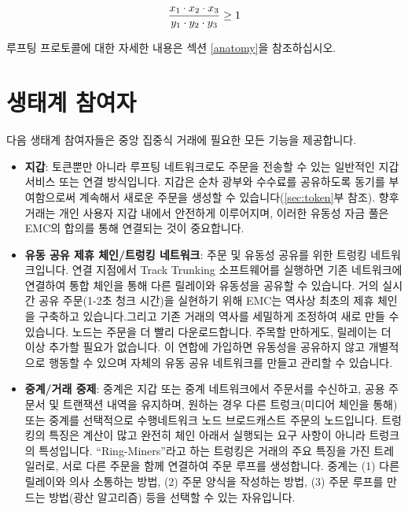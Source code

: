 \documentclass{article}
\begin{document}
\begin{multicols}{2}
\begin{equation}
	{{x_1 \cdot x_2 \cdot x_3 \over y_1 \cdot y_2 \cdot y_3}\geq 1}
\end{equation}

\indent 루프팅 프로토콜에 대한 자세한 내용은 섹션 \ref{anatomy}을 참조하십시오.  




\section{생태계 참여자\label{sec:ecosystem}}
\indent 다음 생태계 참여자들은 중앙 집중식 거래에 필요한 모든 기능을 제공합니다.

\begin{itemize}
	
	\item \textbf{지갑}: 토큰뿐만 아니라 루프팅 네트워크로도 주문을 전송할 수 있는 일반적인 지갑 서비스 또는 연결 방식입니다. 지갑은 순차 광부와 수수료를 공유하도록 동기를 부여함으로써 계속해서 새로운 주문을 생성할 수 있습니다(\ref{sec:token}부 참조). 향후 거래는 개인 사용자 지갑 내에서 안전하게 이루어지며, 이러한 유동성 자금 풀은 EMC의 합의를 통해 연결되는 것이 중요합니다.

	\item \textbf{유동 공유 제휴 체인/트렁킹 네트워크}: 주문 및 유동성 공유를 위한 트렁킹 네트워크입니다. 연결 지점에서 Track Trunking 소프트웨어를 실행하면 기존 네트워크에 연결하여 통합 체인을 통해 다른 릴레이와 유동성을 공유할 수 있습니다. 거의 실시간 공유 주문(1-2초 청크 시간)을 실현하기 위해 EMC는 역사상 최초의 제휴 체인을 구축하고 있습니다.그리고 기존 거래의 역사를 세밀하게 조정하여 새로 만들 수 있습니다. 노드는 주문을 더 빨리 다운로드합니다. 주목할 만하게도, 릴레이는 더 이상 추가할 필요가 없습니다. 이 연합에 가입하면 유동성을 공유하지 않고 개별적으로 행동할 수 있으며 자체의 유동 공유 네트워크를 만들고 관리할 수 있습니다.

	\item \textbf{중계/거래 중제}: 중계은 지갑 또는 중계 네트워크에서 주문서를 수신하고, 공용 주문서 및 트랜잭션 내역을 유지하며, 원하는 경우 다른 트렁크(미디어 체인을 통해) 또는 중계를 선택적으로 수행네트워크 노드 브로드캐스트 주문의 노드입니다. 트렁킹의 특징은 계산이 많고 완전히 체인 아래서 실행되는 요구 사항이 아니라 트렁크의 특성입니다. \enquote{Ring-Miners}라고 하는 트렁킹은 거래의 주요 특징을 가진 트레일러로, 서로 다른 주문을 함께 연결하여 주문 루프를 생성합니다. 중계는 (1) 다른 릴레이와 의사 소통하는 방법, (2) 주문 양식을 작성하는 방법, (3) 주문 루프를 만드는 방법(광산 알고리즘) 등을 선택할 수 있는 자유입니다.


\end{itemize}
\end{multicols}
\end{document}
